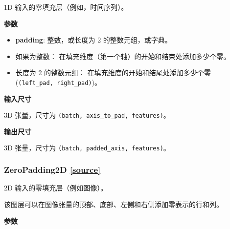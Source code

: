 \begin{Shaded}
\begin{Highlighting}[]
\OperatorTok{=}\NormalTok{)}
\end{Highlighting}
\end{Shaded}

1D 输入的零填充层（例如，时间序列）。

\textbf{参数}

\begin{itemize}
\tightlist
\item
  \textbf{padding}: 整数，或长度为 2 的整数元组，或字典。
\item
  如果为整数： 在填充维度（第一个轴）的开始和结束处添加多少个零。
\item
  长度为 2 的整数元组： 在填充维度的开始和结尾处添加多少个零
  (\texttt{(left\_pad,\ right\_pad)})。
\end{itemize}

\textbf{输入尺寸}

3D 张量，尺寸为 \texttt{(batch,\ axis\_to\_pad,\ features)}。

\textbf{输出尺寸}

3D 张量，尺寸为 \texttt{(batch,\ padded\_axis,\ features)}。




\subsubsection{ZeroPadding2D {\href{https://github.com/keras-team/keras/blob/master/keras/layers/convolutional.py\#L1734}{{[}source{]}}}}

\begin{Shaded}
\begin{Highlighting}[]
\OperatorTok{=}\NormalTok{(}\NormalTok{, }\OperatorTok{=}\NormalTok{)}
\end{Highlighting}
\end{Shaded}

2D 输入的零填充层（例如图像）。

该图层可以在图像张量的顶部、底部、左侧和右侧添加零表示的行和列。

\textbf{参数}

